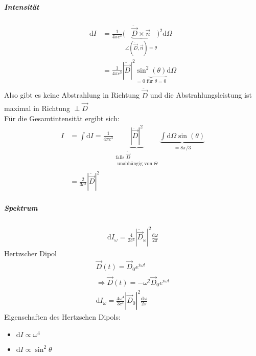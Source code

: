 \documentclass[a4paper]{article}
\newcommand{\intd}{\int\!\mathrm{d}}
\begin{document}
\subparagraph{Intensität}
\begin{align}
\mathrm{d}I&=\frac{1}{4\pi c^3}\big( \underbrace{\ddot{\vec{D}}\times\vec{n}
}_{\angle(\ddot{\vec{D}},\vec{n})=\theta}\big)^2\mathrm{d}\Omega\\
&=\frac{1}{4\pi c^3}|\ddot{\vec{D}}|^2
\underbrace{\sin^2(\theta)}_{=0 \text{ f\"ur }\theta=0}\mathrm{d}\Omega\\
\end{align}
Also gibt es keine Abstrahlung in Richtung $\ddot{\vec{D}}$ und die
Abstrahlungsleistung ist maximal in Richtung $\perp \ddot{\vec{D}}$\\
Für die Gesamtintensität ergibt sich:
\begin{align}
I&=\intd I=\frac{1}{4\pi
c^3}\underbrace{|\ddot{\vec{D}}|^2}_{\substack{\text{falls } \ddot{\vec{D}}\\
\text{ unabhängig von }\Theta}} \underbrace{\int\mathrm{d} \Omega
\sin(\theta)}_{=8\pi/3}\\
&=\frac{2}{3c^3}|\ddot{\vec{D}}|^2
\end{align}
\subparagraph{Spektrum}
\begin{align}
\mathrm{d}I_\omega=\frac{4}{3c^3}|\ddot{\vec{D}}_\omega|^2\frac{\mathrm{d}\omega}{2\pi}
\end{align}
Hertzscher Dipol
\begin{align}
\vec{D}(t)=\vec{D}_0 e^{i\omega t}\\
\Rightarrow \ddot{\vec{D}}(t)=-\omega^2\vec{D}_0 e^{i\omega t}\\
\mathrm{d}I_\omega=\frac{4\omega^4}{3c^3}|\ddot{\vec{D}}_0|^2\frac{\mathrm{d}\omega}{2\pi}
\end{align}
Eigenschaften des Hertzschen Dipols:
\begin{itemize}
  \item $\mathrm{d}I\propto \omega^4$
  \item $\mathrm{d}I\propto \sin^2\theta$
\end{itemize}
\end{document}

